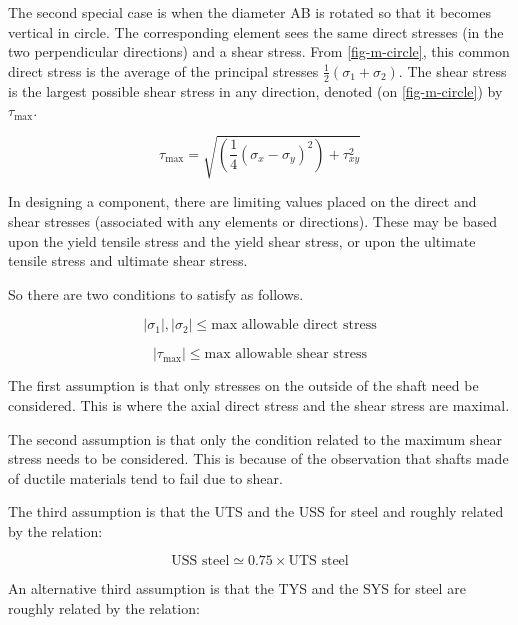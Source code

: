 The second special case is when the diameter AB is rotated so that it becomes vertical in circle. The corresponding element sees the same direct stresses (in the two perpendicular directions) and a shear stress. From \cref{fig-m-circle}, this common direct stress is the average of the principal stresses \(\frac{1}{2}(\sigma_1+\sigma_2)\). The shear stress is the largest possible shear stress in any direction, denoted (on \cref{fig-m-circle}) by \(\tau_{\max}\).

\begin{equation}
    \tau_{\max} = \sqrt{\left(\frac{1}{4}(\sigma_x-\sigma_y)^2\right)+\tau_{xy}^2}
    \label{equ:tau-max}
\end{equation}

In designing a component, there are limiting values placed on the direct and shear stresses (associated with any elements or directions). These may be based upon the yield tensile stress and the yield shear stress, or upon the ultimate tensile stress and ultimate shear stress.

So there are two conditions to satisfy as follows.

\begin{equation}
    |\sigma_1|,|\sigma_2| \leq \text{max\ allowable\ direct\ stress}
\end{equation}

\begin{equation}
    |\tau_{\max}| \leq \text{max\ allowable\ shear\ stress}
\end{equation}

The first assumption is that only stresses on the outside of the shaft need be considered. This is where the axial direct stress and the shear stress are maximal.

The second assumption is that only the condition related to the maximum shear stress needs to be considered. This is because of the observation that shafts made of ductile materials tend to fail due to shear.

The third assumption is that the \acf{UTS} and the \acf{USS} for steel and roughly related by the relation:

\begin{equation}
    \text{USS steel} \simeq 0.75 \times \text{UTS steel}
\end{equation}

An alternative third assumption is that the \acf{TYS} and the \acf{SYS} for steel are roughly related by the relation:

